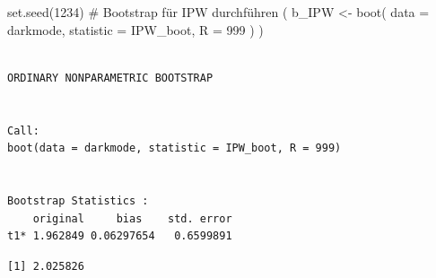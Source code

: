 \documentclass[
  a4paper,
  DIV=11,
  oneside]{scrreprt}
\newenvironment{Shaded}{\begin{snugshade}}{\end{snugshade}}
\newcommand{\AttributeTok}[1]{\textcolor[rgb]{0.40,0.45,0.13}{#1}}
\newcommand{\CommentTok}[1]{\textcolor[rgb]{0.37,0.37,0.37}{#1}}
\newcommand{\DecValTok}[1]{\textcolor[rgb]{0.68,0.00,0.00}{#1}}
\newcommand{\FunctionTok}[1]{\textcolor[rgb]{0.28,0.35,0.67}{#1}}
\newcommand{\NormalTok}[1]{\textcolor[rgb]{0.00,0.23,0.31}{#1}}
\newcommand{\OtherTok}[1]{\textcolor[rgb]{0.00,0.23,0.31}{#1}}
\newcommand{\SpecialCharTok}[1]{\textcolor[rgb]{0.37,0.37,0.37}{#1}}
\begin{document}
\begin{Shaded}
\end{Shaded}

\begin{Shaded}
\begin{Highlighting}[]
\FunctionTok{set.seed}\NormalTok{(}\DecValTok{1234}\NormalTok{)}
\CommentTok{\# Bootstrap für IPW durchführen}
\NormalTok{(}
\NormalTok{  b\_IPW }\OtherTok{\textless{}{-}} \FunctionTok{boot}\NormalTok{(}
    \AttributeTok{data =}\NormalTok{ darkmode,}
    \AttributeTok{statistic =}\NormalTok{ IPW\_boot, }
    \AttributeTok{R =} \DecValTok{999}
\NormalTok{  )}
\NormalTok{)}
\end{Highlighting}
\end{Shaded}

\begin{verbatim}

ORDINARY NONPARAMETRIC BOOTSTRAP


Call:
boot(data = darkmode, statistic = IPW_boot, R = 999)


Bootstrap Statistics :
    original     bias    std. error
t1* 1.962849 0.06297654   0.6599891
\end{verbatim}

\begin{Shaded}
\end{Shaded}

\begin{verbatim}
[1] 2.025826
\end{verbatim}
\end{document}
